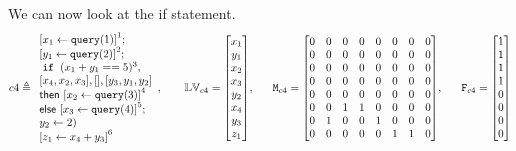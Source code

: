 %
We can now look at the if statement.
\[ 
%
{c}4 \triangleq
\begin{array}{l}
	\left[ {x}_1 \leftarrow \query(1) \right]^1; 
	\\
	\left[{y}_1 \leftarrow \query(2) \right]^2 ; 
	\\
\eif \;( { x_1 + y_1 == 5} )^3,  \\
{[ x_4,x_2,x_3 ],[] ,[y_3,y_1,y_2 ]} 
\\
\mathsf{then} ~ \left[ 
{x}_2 \leftarrow \query(3) \right]^4 
\\
\mathsf{else} ~ \left[ 
{x}_3 \leftarrow \query(4) \right]^5 ; 
\\
{y}_2 \leftarrow 2 ) \\
\left[ { z_1 \leftarrow x_4 +y_3 }\right]^6
\end{array},
~~~~~~
\lvar_{{c}4} =  \left[ \begin{matrix}
{x}_1 \\
{y}_1 \\
{x}_2 \\
{x}_3 \\
{y}_2 \\
{x}_4 \\
{y}_3 \\
{z}_1 \\
\end{matrix} \right], 
~~~~~ 
\Mtrix_{{c}4} =  \left[ \begin{matrix}
0 & 0 & 0 & 0 & 0 & 0 & 0 & 0 \\
0 & 0 & 0 & 0 & 0 & 0 & 0 & 0 \\
0 & 0 & 0 & 0 & 0 & 0 & 0 & 0 \\
0 & 0 & 0 & 0 & 0 & 0 & 0 & 0 \\
0 & 0 & 0 & 0 & 0 & 0 & 0 & 0 \\
0 & 0 & 1 & 1 & 0 & 0 & 0 & 0 \\
0 & 1 & 0 & 0 & 1 & 0 & 0 & 0 \\
0 & 0 & 0 & 0 & 0 & 1 & 1 & 0 \\
\end{matrix} \right], 
~~~~~ 
\flag_{{c}4} = \left [ \begin{matrix}
1 \\
1 \\
1 \\
1 \\
0 \\
0 \\
0 \\
0 \\
\end{matrix} \right ]
\]
%
%
%
%
